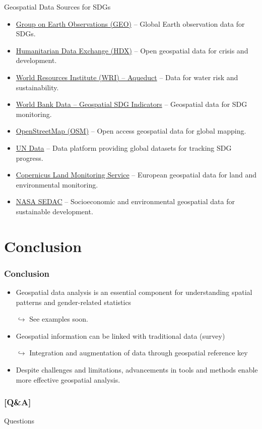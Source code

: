 \documentclass[xcolor=x11names,compress]{beamer}
\renewcommand{\(}{\begin{columns}}
\renewcommand{\)}{\end{columns}}
\newcommand{\<}[1]{\begin{column}{#1}}
\renewcommand{\>}{\end{column}}
\begin{document}
\begin{frame}{Geospatial Data Sources for SDGs}
    \begin{itemize}
        \item \href{https://www.earthobservations.org/sdgs.php}{Group on Earth Observations (GEO)} – Global Earth observation data for SDGs.
        \item \href{https://data.humdata.org/}{Humanitarian Data Exchange (HDX)} – Open geospatial data for crisis and development.
        \item \href{https://www.wri.org/data/wrims-water-data-portal}{World Resources Institute (WRI) – Aqueduct} – Data for water risk and sustainability.
        \item \href{https://datacatalog.worldbank.org/search/dataset/0038272}{World Bank Data – Geospatial SDG Indicators} – Geospatial data for SDG monitoring.
        \item \href{https://www.openstreetmap.org}{OpenStreetMap (OSM)} – Open access geospatial data for global mapping.
        \item \href{https://data.un.org/}{UN Data} – Data platform providing global datasets for tracking SDG progress.
        \item \href{https://land.copernicus.eu/}{Copernicus Land Monitoring Service} – European geospatial data for land and environmental monitoring.
        \item \href{https://sedac.ciesin.columbia.edu/}{NASA SEDAC} – Socioeconomic and environmental geospatial data for sustainable development.
    \end{itemize}
\end{frame}

\section{Conclusion}
\begin{frame}
\frametitle{Conclusion}
    \begin{itemize}[<+->]
        \item Geospatial data analysis is an essential component for understanding spatial patterns and gender-related statistics
        \item[$\hookrightarrow$] See examples soon.
        \item Geospatial information can be linked with traditional data (survey)
         \item[$\hookrightarrow$] Integration and augmentation of data through geospatial reference key
        \item Despite challenges and limitations, advancements in tools and methods enable more effective geospatial analysis.
    \end{itemize}
\end{frame}







\begin{frame} %
\frametitle{\textcolor{brique}{[Q\&A]}}
\begin{center}
\Large \textcolor{siap}{ Questions}
\end{center}
\end{frame}
\end{document}
